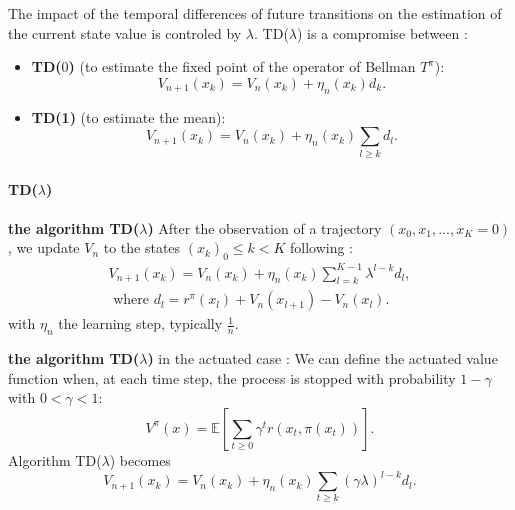 \documentclass[12pt,svgnames,table]{beamer}
\begin{document}
\begin{frame}
The impact of the temporal differences of future transitions on the estimation of the current state value is controled by $\lambda$. TD($\lambda$) is a compromise between : 
\begin{itemize}
 \item \textbf{TD($0$)} (to estimate the fixed point of the operator of Bellman $T^{\pi}$): 
 \begin{equation*}
  V_{n+1}(x_k) = V_n(x_k) + \eta_n(x_k)d_k. 
 \end{equation*}
 \item \textbf{TD(1)} (to estimate the mean): 
 \begin{equation*} 
 V_{n+1}(x_k) = V_n(x_k) + \eta_n(x_k)\sum_{l\geqslant k}d_l. 
 \end{equation*} 
\end{itemize}
\end{frame}

\begin{frame}
\frametitle{\insertsection}
\framesubtitle{\footnotesize TD($\lambda$)}
\textbf{the algorithm TD($\lambda$)} %
 After the observation of a trajectory $(x_0,x_1,...,x_K = 0)$, we update $V_n$	 to the states $(x_k)_0 \leqslant k<K$ following :
\begin{eqnarray*}
V_{n+1}(x_k) = V_n(x_k) + \eta_n(x_k)\sum_{l=k}^{K-1}\lambda^{l-k}d_l,\\ 
\mbox{ where } d_l = r^{\pi}(x_l) + V_n(x_{l+1})-V_n(x_l).
\end{eqnarray*}
with $\eta_n$ the learning step, typically $\frac{1}{n}$.

\end{frame}



\begin{frame}
\textbf{the algorithm TD($\lambda$)} in the actuated case :
We can define the actuated value function when, at each time step,
the process is stopped with probability $1 - \gamma$ with $0 < \gamma <1$:
\[ V^{\pi}(x) = \mathbb{E} [ \sum_{t \geqslant 0} \gamma^t r(x_t,\pi(x_t))  ]. \]
Algorithm TD($\lambda$) becomes
\begin{equation*}
V_{n+1}(x_k)=V_n(x_k)+\eta_n(x_k)\sum_{t \geqslant k}(\gamma \lambda)^{l-k}d_l.
\end{equation*}
\end{frame}
\end{document}
